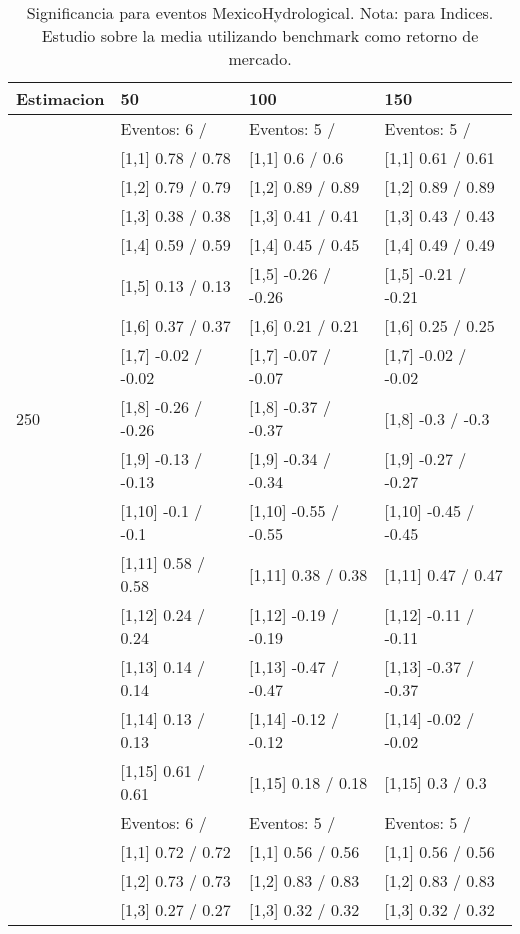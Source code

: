 \begin{table}

\caption{Significancia para eventos MexicoHydrological. Nota: para Indices. Estudio sobre la media utilizando benchmark como retorno de mercado.}
\centering
\begin{tabular}[t]{llll}
\toprule
Estimacion & 50 & 100 & 150\\
\midrule
 & Eventos:  6 / & Eventos:  5 / & Eventos:  5 /\\
 & {}[1,1] 0.78  / 0.78 & {}[1,1] 0.6  / 0.6 & {}[1,1] 0.61  / 0.61\\
 & {}[1,2] 0.79  / 0.79 & {}[1,2] 0.89  / 0.89 & {}[1,2] 0.89  / 0.89\\
 & {}[1,3] 0.38  / 0.38 & {}[1,3] 0.41  / 0.41 & {}[1,3] 0.43  / 0.43\\
 & {}[1,4] 0.59  / 0.59 & {}[1,4] 0.45  / 0.45 & {}[1,4] 0.49  / 0.49\\
\addlinespace
 & {}[1,5] 0.13  / 0.13 & {}[1,5] -0.26  / -0.26 & {}[1,5] -0.21  / -0.21\\
 & {}[1,6] 0.37  / 0.37 & {}[1,6] 0.21  / 0.21 & {}[1,6] 0.25  / 0.25\\
 & {}[1,7] -0.02  / -0.02 & {}[1,7] -0.07  / -0.07 & {}[1,7] -0.02  / -0.02\\
250 & {}[1,8] -0.26  / -0.26 & {}[1,8] -0.37  / -0.37 & {}[1,8] -0.3  / -0.3\\
 & {}[1,9] -0.13  / -0.13 & {}[1,9] -0.34  / -0.34 & {}[1,9] -0.27  / -0.27\\
\addlinespace
 & {}[1,10] -0.1  / -0.1 & {}[1,10] -0.55  / -0.55 & {}[1,10] -0.45  / -0.45\\
 & {}[1,11] 0.58  / 0.58 & {}[1,11] 0.38  / 0.38 & {}[1,11] 0.47  / 0.47\\
 & {}[1,12] 0.24  / 0.24 & {}[1,12] -0.19  / -0.19 & {}[1,12] -0.11  / -0.11\\
 & {}[1,13] 0.14  / 0.14 & {}[1,13] -0.47  / -0.47 & {}[1,13] -0.37  / -0.37\\
 & {}[1,14] 0.13  / 0.13 & {}[1,14] -0.12  / -0.12 & {}[1,14] -0.02  / -0.02\\
\addlinespace
 & {}[1,15] 0.61  / 0.61 & {}[1,15] 0.18  / 0.18 & {}[1,15] 0.3  / 0.3\\
 & Eventos:  6 / & Eventos:  5 / & Eventos:  5 /\\
 & {}[1,1] 0.72  / 0.72 & {}[1,1] 0.56  / 0.56 & {}[1,1] 0.56  / 0.56\\
 & {}[1,2] 0.73  / 0.73 & {}[1,2] 0.83  / 0.83 & {}[1,2] 0.83  / 0.83\\
 & {}[1,3] 0.27  / 0.27 & {}[1,3] 0.32  / 0.32 & {}[1,3] 0.32  / 0.32\\

\end{tabular}
\end{table}
